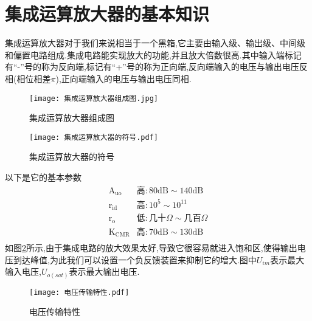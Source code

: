 \section{\K 集成运算放大器的基本知识}
\Par 集成运算放大器对于我们来说相当于一个黑箱,它主要由输入级、输出级、中间级和偏置电路组成.集成电路能实现放大的功能,并且放大倍数很高.其中输入端标记有“-”号的称为反向端,标记有“+”号的称为正向端,反向端输入的电压与输出电压反相(相位相差$\pi$),正向端输入的电压与输出电压同相.
\begin{figure}[htbp]
	\centering
	\begin{minipage}[b]{0.48\textwidth}
        \centering
        \texttt{[image: 集成运算放大器组成图.jpg]}
        \caption{集成运算放大器组成图}
	    \label{fig:集成运算放大器组成图}
    \end{minipage}
    \begin{minipage}[b]{0.48\textwidth}
        \centering
        \texttt{[image: 集成运算放大器的符号.pdf]}
        \caption{集成运算放大器的符号}
	    \label{fig:集成运算放大器的符号}
    \end{minipage}
\end{figure}

\Par 以下是它的基本参数
\begin{equation*}
    \begin{matrix}
        \mathrm{A}_{\mathrm{uo}}&		\text{高}:80\mathrm{dB}\sim 140\mathrm{dB}\\
        \mathrm{r}_{\mathrm{id}}&		\text{高}:10^5\sim 10^{11}\\
        \mathrm{r}_{\mathrm{o}}&		\text{低}:\text{几十}\Omega \sim \text{几百}\Omega\\
        \mathrm{K}_{\mathrm{CMR}}&		\text{高}:70\mathrm{dB}\sim 130\mathrm{dB}\\
    \end{matrix}
\end{equation*}
\Par 如图\ref{fig:电压传输特性}所示,由于集成电路的放大效果太好,导致它很容易就进入饱和区,使得输出电压到达峰值,为此我们可以设置一个负反馈装置来抑制它的增大.图中$U_{im}$表示最大输入电压,$U_{o(sat)}$表示最大输出电压.

\begin{figure}[htbp]
	\centering
	\texttt{[image: 电压传输特性.pdf]}
	\caption{电压传输特性}
	\label{fig:电压传输特性}
\end{figure}

